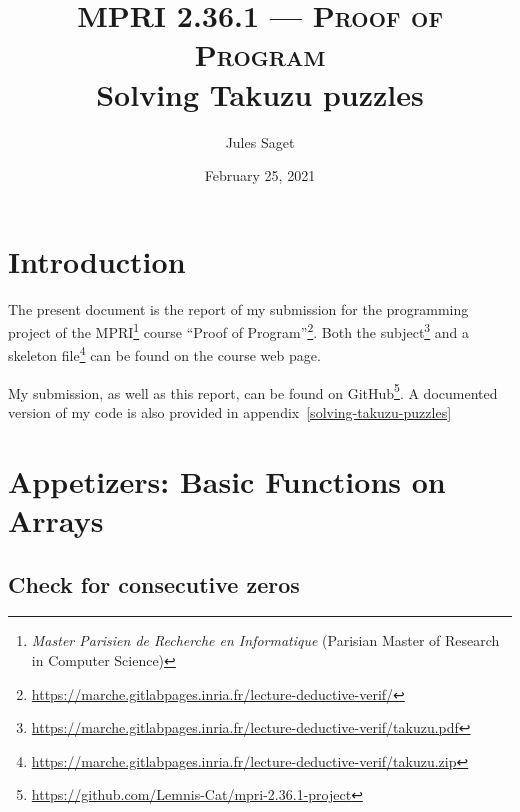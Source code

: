 \documentclass[a4paper]{article}
\title{{\normalsize \textsc{MPRI 2.36.1 --- Proof of Program}}\\
  Solving Takuzu puzzles
}
\author{Jules Saget}
\date{February 25, 2021}
\begin{document}
\maketitle

\section{Introduction}
\label{sec:intro}

The present document is the report of my submission for the programming project
of the MPRI\footnote{\emph{Master Parisien de Recherche en Informatique}
  (Parisian Master of Research in Computer Science)} course ``Proof of
Program''\footnote{\url{https://marche.gitlabpages.inria.fr/lecture-deductive-verif/}}.
Both the
subject\footnote{\url{https://marche.gitlabpages.inria.fr/lecture-deductive-verif/takuzu.pdf}}
and a skeleton
file\footnote{\url{https://marche.gitlabpages.inria.fr/lecture-deductive-verif/takuzu.zip}}
can be found on the course web page.

My submission, as well as this report, can be found on
GitHub\footnote{\url{https://github.com/Lemnis-Cat/mpri-2.36.1-project}}.
A documented version of my code is also provided in appendix~\ref{solving-takuzu-puzzles}

\tableofcontents

\section{Appetizers: Basic Functions on Arrays}
\label{sec:appetizers}

\subsection{Check for consecutive zeros}
\end{document}
